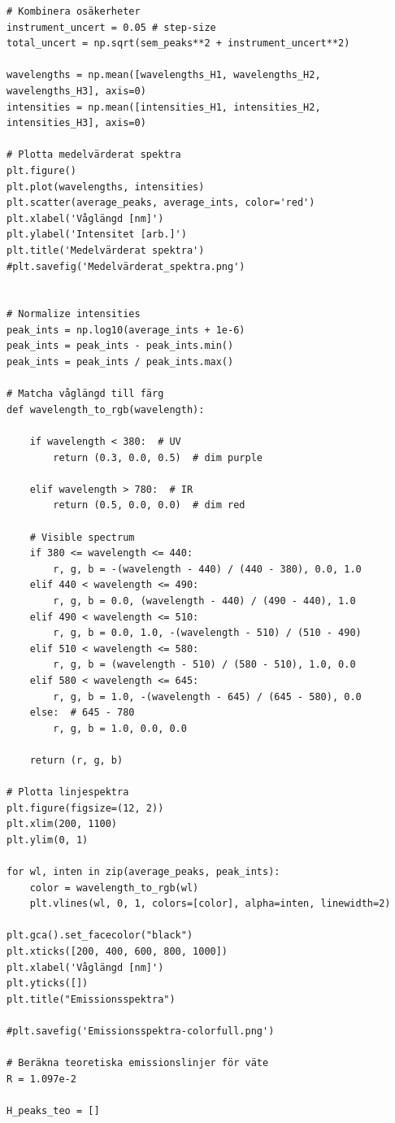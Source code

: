 \documentclass[12pt, a4paper]{article}
\begin{document}
\begin{lstlisting}[style=mypython]
# Kombinera osäkerheter
instrument_uncert = 0.05 # step-size
total_uncert = np.sqrt(sem_peaks**2 + instrument_uncert**2)

wavelengths = np.mean([wavelengths_H1, wavelengths_H2, wavelengths_H3], axis=0)
intensities = np.mean([intensities_H1, intensities_H2, intensities_H3], axis=0)

# Plotta medelvärderat spektra
plt.figure()
plt.plot(wavelengths, intensities)
plt.scatter(average_peaks, average_ints, color='red')
plt.xlabel('Våglängd [nm]')
plt.ylabel('Intensitet [arb.]')
plt.title('Medelvärderat spektra')
#plt.savefig('Medelvärderat_spektra.png')


# Normalize intensities
peak_ints = np.log10(average_ints + 1e-6)
peak_ints = peak_ints - peak_ints.min()
peak_ints = peak_ints / peak_ints.max()

# Matcha våglängd till färg
def wavelength_to_rgb(wavelength):
    
    if wavelength < 380:  # UV
        return (0.3, 0.0, 0.5)  # dim purple
    
    elif wavelength > 780:  # IR
        return (0.5, 0.0, 0.0)  # dim red
    
    # Visible spectrum
    if 380 <= wavelength <= 440:
        r, g, b = -(wavelength - 440) / (440 - 380), 0.0, 1.0
    elif 440 < wavelength <= 490:
        r, g, b = 0.0, (wavelength - 440) / (490 - 440), 1.0
    elif 490 < wavelength <= 510:
        r, g, b = 0.0, 1.0, -(wavelength - 510) / (510 - 490)
    elif 510 < wavelength <= 580:
        r, g, b = (wavelength - 510) / (580 - 510), 1.0, 0.0
    elif 580 < wavelength <= 645:
        r, g, b = 1.0, -(wavelength - 645) / (645 - 580), 0.0
    else:  # 645 - 780
        r, g, b = 1.0, 0.0, 0.0

    return (r, g, b)

# Plotta linjespektra
plt.figure(figsize=(12, 2))
plt.xlim(200, 1100)
plt.ylim(0, 1)

for wl, inten in zip(average_peaks, peak_ints):
    color = wavelength_to_rgb(wl)
    plt.vlines(wl, 0, 1, colors=[color], alpha=inten, linewidth=2)

plt.gca().set_facecolor("black")
plt.xticks([200, 400, 600, 800, 1000])
plt.xlabel('Våglängd [nm]')
plt.yticks([])
plt.title("Emissionsspektra")

#plt.savefig('Emissionsspektra-colorfull.png')

# Beräkna teoretiska emissionslinjer för väte
R = 1.097e-2

H_peaks_teo = []
    

\end{lstlisting}
\end{document}
